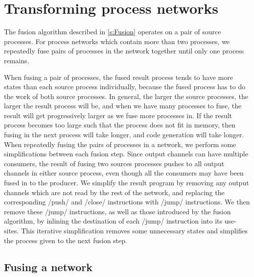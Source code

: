 \section{Transforming process networks}
\label{s:Optimisation}

The fusion algorithm described in \cref{s:Fusion} operates on a pair of source processes.
For process networks which contain more than two processes, we repeatedly fuse pairs of processes in the network together until only one process remains.

When fusing a pair of processes, the fused result process tends to have more states than each source process individually, because the fused process has to do the work of both source processes.
In general, the larger the source processes, the larger the result process will be, and when we have many processes to fuse, the result will get progressively larger as we fuse more processes in.
If the result process becomes too large such that the process does not fit in memory, then fusing in the next process will take longer, and code generation will take longer.
When repeatedly fusing the pairs of processes in a network, we perform some simplifications between each fusion step.
Since output channels can have multiple consumers, the result of fusing two sources processes pushes to all output channels in either source process, even though all the consumers may have been fused in to the producer.
We simplify the result program by removing any output channels which are not read by the rest of the network, and replacing the corresponding \Hs/push/ and \Hs/close/ instructions with \Hs/jump/ instructions.
We then remove these \Hs/jump/ instructions, as well as those introduced by the fusion algorithm, by inlining the destination of each \Hs/jump/ instruction into its use-sites.
This iterative simplification removes some unnecessary states and simplifies the process given to the next fusion step.



\subsection{Fusing a network}
\label{ss:Fusing:a:network}


